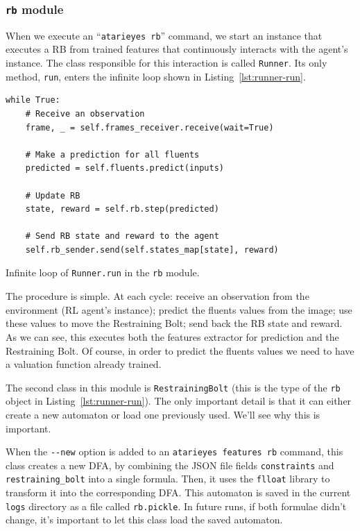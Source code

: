 \subsubsection*{\texttt{rb} module}

When we execute an ``\texttt{atarieyes rb}'' command, we start an instance
that executes a RB from trained features that continuously interacts with the
agent's instance. The class responsible for this interaction is called
\texttt{Runner}. Its only method, \texttt{run}, enters the infinite loop shown
in Listing~\ref{lst:runner-run}.
\begin{listing}
	\begin{verbatim}
while True:
	# Receive an observation
	frame, _ = self.frames_receiver.receive(wait=True)

	# Make a prediction for all fluents
	predicted = self.fluents.predict(inputs)

	# Update RB
	state, reward = self.rb.step(predicted)

	# Send RB state and reward to the agent
	self.rb_sender.send(self.states_map[state], reward)
\end{verbatim}
\caption{Infinite loop of \texttt{Runner.run} in the \texttt{rb} module.}
\label{lst:runner-run}
\end{listing}
The procedure is simple. At each cycle: receive an observation from the
environment (RL agent's instance); predict the fluents values from the image;
use these values to move the Restraining Bolt; send back the RB state and
reward. As we can see, this executes both the features extractor for
prediction and the Restraining Bolt. Of course, in order to predict the
fluents values we need to have a valuation function already trained.

The second class in this module is \texttt{RestrainingBolt} (this is the type
of the \texttt{rb} object in Listing~\ref{lst:runner-run}). The only important
detail is that it can either create a new automaton or load one previously
used. We'll see why this is important.

When the \verb|--new| option is added to an \verb|atarieyes features rb|
command, this class creates a new DFA, by combining the JSON file fields
\texttt{constraints} and \texttt{restraining\_bolt} into a single formula.
Then, it uses the \texttt{flloat} library to transform it into the
corresponding DFA. This automaton is saved in the current \texttt{logs}
directory as a file called \verb|rb.pickle|. In future runs, if both formulae
didn't change, it's important to let this class load the saved automaton.

